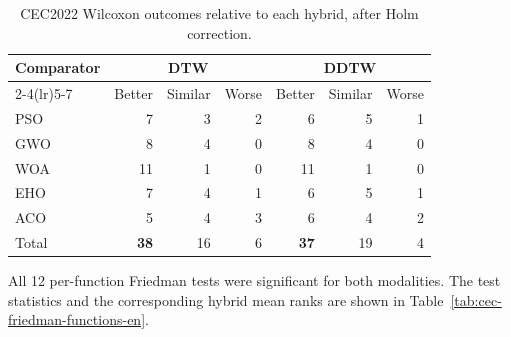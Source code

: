 \begin{table}[p]
\centering
\caption{CEC2022 Wilcoxon outcomes relative to each hybrid, after Holm correction.}
\label{tab:cec-outcomes-en}
\begin{tabular}{lrrrrrr}
\toprule
Comparator & \multicolumn{3}{c}{DTW} & \multicolumn{3}{c}{DDTW} \\
\cmidrule(lr){2-4}\cmidrule(lr){5-7}
 & Better & Similar & Worse & Better & Similar & Worse \\
\midrule
PSO & 7 & 3 & 2 & 6 & 5 & 1 \\
GWO & 8 & 4 & 0 & 8 & 4 & 0 \\
WOA & 11 & 1 & 0 & 11 & 1 & 0 \\
EHO & 7 & 4 & 1 & 6 & 5 & 1 \\
ACO & 5 & 4 & 3 & 6 & 4 & 2 \\
\midrule
Total & \textbf{38} & 16 & 6 & \textbf{37} & 19 & 4 \\
\bottomrule
\end{tabular}
\end{table}

All 12 per-function Friedman tests were significant for both modalities. The
test statistics and the corresponding hybrid mean ranks are shown in
Table~\ref{tab:cec-friedman-functions-en}.

